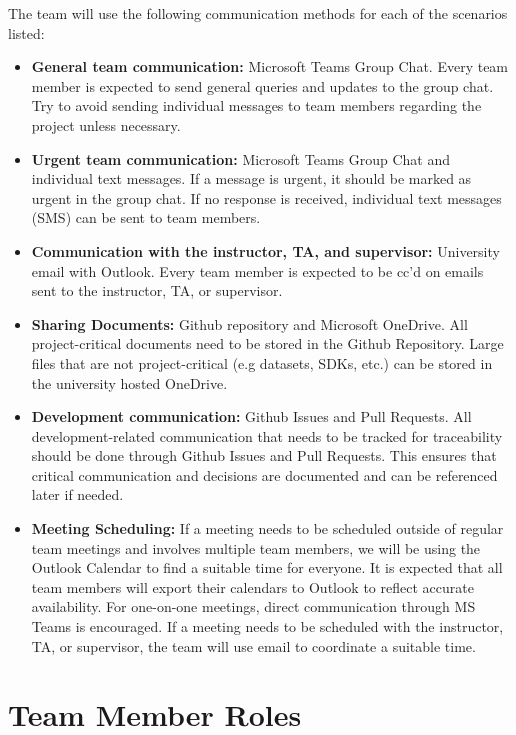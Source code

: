 \documentclass{article}
\begin{document}
The team will use the following communication methods for each of the scenarios
listed:
\begin{itemize}
  \item \textbf{General team communication:} Microsoft Teams Group Chat. Every
  team member is expected to send general queries and updates to the group chat.
  Try to avoid sending individual messages to team members regarding the project
  unless necessary.
  \item \textbf{Urgent team communication:} Microsoft Teams Group Chat and
  individual text messages. If a message is urgent, it should be marked as
  urgent in the group chat. If no response is received, individual text messages
  (SMS) can be sent to team members.
  \item \textbf{Communication with the instructor, TA, and supervisor:}
  University email with Outlook. Every team member is expected to be cc'd on
  emails sent to the instructor, TA, or supervisor.
  \item \textbf{Sharing Documents:} Github repository and Microsoft OneDrive.
  All project-critical documents need to be stored in the Github Repository.
  Large files that are not project-critical (e.g datasets, SDKs, etc.) can be
  stored in the university hosted OneDrive.
  \item \textbf{Development communication:} Github Issues and Pull Requests.
  All development-related communication that needs to be tracked for
  traceability should be done through Github Issues and Pull Requests. This
  ensures that critical communication and decisions are documented and can be
  referenced later if needed.
  \item \textbf{Meeting Scheduling:} If a meeting needs to be scheduled outside
  of regular team meetings and involves multiple team members, we will be using
  the Outlook Calendar to find a suitable time for everyone. It is expected that
  all team members will export their calendars to Outlook to reflect accurate
  availability. For one-on-one meetings, direct communication through MS Teams
  is encouraged. If a meeting needs to be scheduled with the instructor, TA, or
  supervisor, the team will use email to coordinate a suitable time. 
\end{itemize}

\section{Team Member Roles}\label{sec:TeamMemberRoles}
\end{document}
